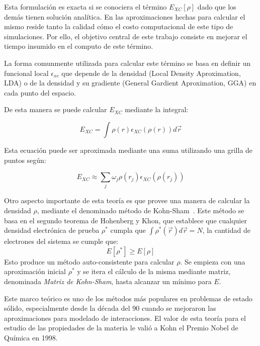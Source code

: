 Esta formulaci\'on es exacta si se conociera el t\'ermino $E_{XC}[\rho]$ dado que los dem\'as tienen soluci\'on anal\'itica.
En las aproximaciones hechas para calcular el mismo reside tanto la calidad c\'omo el costo computacional de este tipo de simulaciones.
Por ello, el objetivo central de este trabajo consiste en mejorar el tiempo insumido en el computo de este t\'ermino.

La forma comunmente utilizada para calcular este t\'ermino se basa en definir un funcional local $\epsilon_{xc}$ que depende de la densidad (Local Density Aproximation, LDA) o de la densidad y su gradiente (General Gardient Aproximation, GGA) en cada punto del espacio.

De esta manera se puede calcular $E_{XC}$ mediante la integral:

\begin{equation}
  E_{XC} = \int \rho(r) \epsilon_{XC}\left( \rho(r) \right ) d\vec{r}
\end{equation}

Esta ecuaci\'on puede ser aproximada mediante una suma utilizando una grilla de puntos seg\'un:

\begin{equation}
    \label{eq:xc}
    E_{XC} \approx \sum_j \omega_j \rho(r_j) \epsilon_{XC} (\rho(r_j))
\end{equation}

Otro aspecto importante de esta teor\'ia es que provee una manera de calcular la densidad $\rho$, mediante el denominado m\'etodo de Kohn-Sham~\cite{KohnSham}.
Este m\'etodo se basa en el segundo teorema de Hohenberg y Khon, que establece que cualquier densidad electr\'onica de prueba $\rho^*$ cumpla que $\int \rho^*(\vec{r}) d\vec{r} = N$, la cantidad de electrones del sistema
se cumple que:
\begin{equation}
    \label{princ_variacional}
    E[\rho^*] \geq E[\rho]
\end{equation}
Esto produce un m\'etodo auto-consistente para calcular $\rho$.
Se empieza con una aproximaci\'on inicial $\rho^*$ y se itera el c\'alculo de la misma mediante matriz, denominada \textit{Matriz de Kohn-Sham}, hasta alcanzar un m\'inimo para $E$.

Este marco te\'orico es uno de los m\'etodos m\'as populares en problemas de estado s\'olido, especialmente desde la d\'ecada del 90 cuando se mejoraron las aproximaciones para modelado de interacciones.
El valor de esta teor\'ia para el estudio de las propiedades de la materia le vali\'o a Kohn el Premio Nobel de Qu\'imica en 1998.

